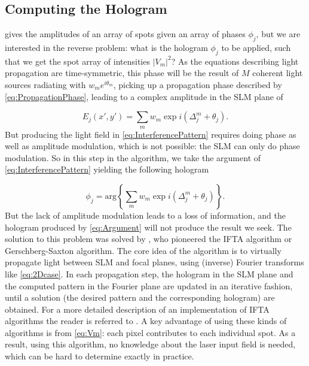 \subsection{Computing the Hologram}\label{sec:GSW}

 gives the amplitudes of an array of spots given an array of phases $\phi_j$, but we are interested in the reverse problem: what is the hologram $\phi_j$ to be applied, such that we get the spot array of intensities $|V_m|^2$? 
As the equations describing light propagation are time-symmetric, this phase will be the result of $M$ coherent light sources radiating with $w_m e^{i \theta_m}$, picking up a propagation phase described by \cref{eq:PropagationPhase}, leading to a complex amplitude in the \ac{SLM} plane of \cite{Leseleuc2018,DiLeonardo2007}

\begin{equation}\label{eq:InterferencePattern}
    E_j (x',y') = \sum_m w_m \exp{
    i\left(\Delta_j^m + \theta_j\right)
    }.
\end{equation}
But producing the light field in \cref{eq:InterferencePattern} requires doing phase as well as amplitude modulation, which is not possible: the SLM can only do phase modulation.
So in this step in the algorithm, we take the argument of  \cref{eq:InterferencePattern} yielding the following hologram

\begin{equation}\label{eq:Argument}
    \phi_j = \text{arg}\left\{
     \sum_m w_m \exp{
    i\left(\Delta_j^m + \theta_j\right)
    }
    \right\}.
\end{equation}
But the lack of amplitude modulation leads to a loss of information, and the hologram produced by \cref{eq:Argument} will not produce the result we seek.
The solution to this problem was solved by \cite{Gerschberg1972}, who pioneered the \ac{IFTA} algorithm or Gerschberg-Saxton algorithm.
The core idea of the algorithm is to virtually propagate light between SLM and focal planes, using (inverse) Fourier transforms like \cref{eq:2Dcase}.
In each propagation step, the hologram in the SLM plane and the computed pattern in the Fourier plane are updated in an iterative fashion, until a solution (the desired pattern and the corresponding hologram) are obtained.
For a more detailed description of an implementation of IFTA algorithms the reader is referred to \cite{Bijnen2015,Bijnen2013}.
A key advantage of using these kinds of algorithms is from \cref{eq:Vm}: each pixel contributes to each individual spot.
As a result, using this algorithm, no knowledge about the laser input field is needed, which can be hard to determine exactly in practice.

